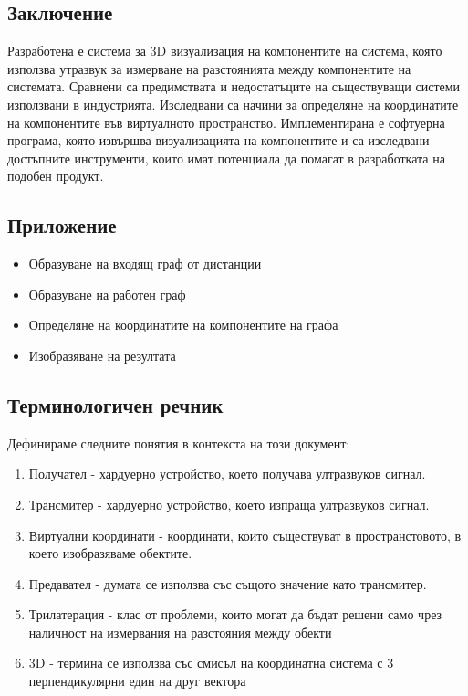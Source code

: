 \subsection{Заключение}
Разработена е система за 3D визуализация на компонентите на система, която използва утразвук за измерване на разстоянията между компонентите на системата. Сравнени са предимствата и недостатъците на съществуващи системи използвани в индустрията. Изследвани са начини за определяне на координатите на компонентите във виртуалното пространство. Имплементирана е софтуерна програма, която извършва визуализацията на компонентите и са изследвани достъпните инструменти, които имат потенциала да помагат в разработката на подобен продукт.

\subsection{Приложение}

\begin{itemize}
    \item Образуване на входящ граф от дистанции
    \item Образуване на работен граф
    \item Определяне на координатите на компонентите на графа
    \item Изобразяване на резултата
\end{itemize}

\subsection{Терминологичен речник}
Дефинираме следните понятия в контекста на този документ:
\begin{enumerate}
    \item Получател - хардуерно устройство, което получава ултразвуков сигнал.
    \item Трансмитер - хардуерно устройство, което изпраща ултразвуков сигнал.
    \item Виртуални координати - координати, които съществуват в пространстовото, в което изобразяваме обектите.
    \item Предавател - думата се използва със същото значение като трансмитер.
    \item Трилатерация - клас от проблеми, които могат да бъдат решени само чрез наличност на измервания на разстояния между обекти \cite{murphy}
    \item 3D - термина се използва със смисъл на координатна система с 3 перпендикулярни един на друг вектора
\end{enumerate}